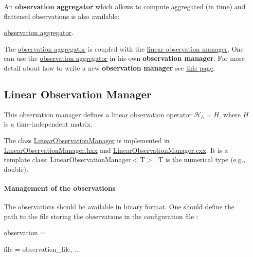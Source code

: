 \documentclass{tufte-book}
\begin{document}
\-An {\bfseries observation aggregator} which allows to compute aggregated (in time) and flattened observations is also available\-:
\begin{DoxyItemize}
\item \hyperlink{observation_aggregator}{observation aggregator}.
\end{DoxyItemize}

\-The \hyperlink{observation_aggregator}{observation aggregator} is coupled with the \hyperlink{linear_observation_manager}{linear observation manager}. \-One can use the \hyperlink{observation_aggregator}{observation aggregator} in his own {\bfseries observation manager}. \-For more detail about how to write a new {\bfseries observation manager} see \hyperlink{plugging_observation}{this page}.

\hypertarget{linear_observation_manager}{}\subsection{Linear Observation Manager}\label{linear_observation_manager}

\-This observation manager defines a linear observation operator $\mathcal{H}_h = H$, where $H$ is a time-\/independent matrix.

\-The class {\ttfamily  \hyperlink{class_verdandi_1_1_linear_observation_manager}{\-Linear\-Observation\-Manager}} is implemented in {\ttfamily \hyperlink{_linear_observation_manager_8hxx_source}{\-Linear\-Observation\-Manager.\-hxx}} and {\ttfamily \hyperlink{_linear_observation_manager_8cxx_source}{\-Linear\-Observation\-Manager.\-cxx}}. \-It is a template class\-: {\ttfamily \-Linear\-Observation\-Manager$<$\-T$>$}. {\ttfamily \-T} is the numerical type (e.\-g., {\ttfamily double}).

\hypertarget{linear_observation_manager_observation1}{}\paragraph{\-Management of the observations}\label{linear_observation_manager_observation1}

\-The observations should be available in binary format. \-One should define the path to the file storing the observations in the configuration file \-:

 \begin{frame_lua}
observation = {

   file = observation_file,
    ...
   }
\end{frame_lua}
\end{document}
